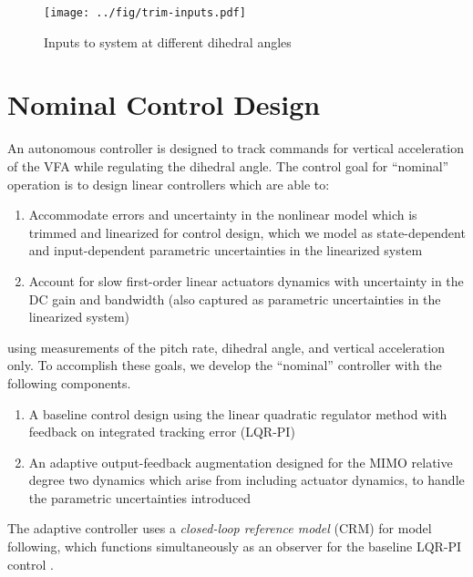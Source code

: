 \documentclass[english]{IEEEtran}
\begin{document}
\begin{figure}[htbp]
	\centering
	\texttt{[image: ../fig/trim-inputs.pdf]}
	\caption{Inputs to system at different dihedral angles}
	\label{fig:trim-inputs}
\end{figure}

\section{Nominal Control Design}
An autonomous controller is designed  to track commands for vertical acceleration of the VFA while regulating the dihedral angle. The control goal for ``nominal'' operation is to design linear controllers which are able to:
\begin{enumerate}
	\item Accommodate errors and uncertainty in the nonlinear model which is trimmed and linearized for control design, which we model as state-dependent and input-dependent parametric uncertainties in the linearized system
	\item Account for slow first-order linear actuators dynamics with uncertainty in the DC gain and bandwidth (also captured as parametric uncertainties in the linearized system)
\end{enumerate}
using measurements of the pitch rate, dihedral angle, and vertical acceleration only. To accomplish these goals, we develop the ``nominal'' controller with the following components.
\begin{enumerate}
	\item A baseline control design using the linear quadratic regulator method with feedback on integrated tracking error (LQR-PI)
	\item An adaptive output-feedback augmentation designed for the MIMO relative degree two dynamics which arise from including actuator dynamics, to handle the parametric uncertainties introduced
\end{enumerate}

The adaptive controller uses a \textit{closed-loop reference model} (CRM) for model following, which functions simultaneously as an observer for the baseline LQR-PI control \cite{lavretsky2015}.
\end{document}
